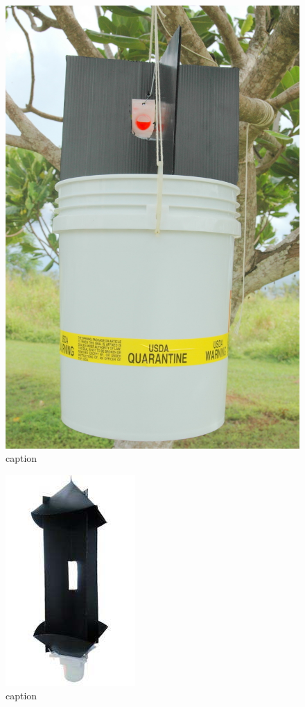 \documentclass[twocolumn,letterpaper]{scrartcl}
\begin{document}
\begin{figure}[h]
	\centering
	\includegraphics[width=0.7\linewidth]{images/uog-bucket}
	\caption{caption}
	\label{fig:uog-bucket}
\end{figure}

\begin{figure}[h]
	\centering
	\includegraphics[width=0.7\linewidth]{images/panel-trap}
	\caption{caption}
	\label{fig:panel-trap}
\end{figure}
\end{document}

